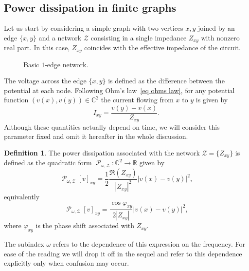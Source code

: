 \documentclass[11pt]{amsart}
\theoremstyle{definition}
\newtheorem{definition}{Definition}[section]
\theoremstyle{remark}
\theoremstyle{example}
\numberwithin{equation}{section}
\providecommand{\pd}[1]{\operatorname{\mathcal {P}}_{#1}}
\begin{document}
\subsection{Power dissipation in finite graphs}

Let us start by considering a simple graph with two vertices $x,y$ joined by an edge $\{x,y\}$ and a network ${\mathcal{Z}}$ consisting in a single impedance $Z_{xy}$ with nonzero real part. In this case, $Z_{xy}$ coincides with the effective impedance of the circuit.

\begin{figure}[H]
\centering
{}
\caption{Basic $1$-edge network.}
\label{simple network}
\end{figure}

The voltage across the edge $\{x,y\}$ is defined as the difference between the potential at each node. Following Ohm's law~\eqref{eq ohms law}, for any potential function $(v(x),v(y))\in{{\mathbb C}}^2$ the current flowing from $x$ to $y$ is given by
\begin{equation}\label{eq new Ohm}
I_{xy}=\frac{v(y)-v(x)}{Z_{xy}}.
\end{equation}
Although these quantities actually depend on time, we will consider this parameter fixed and omit it hereafter in the whole discussion.
\begin{definition}
The power dissipation associated with the network ${\mathcal{Z}}=\{Z_{xy}\}$ is defined as the quadratic form $\pd{\omega,{\mathcal{Z}}}\colon{{\mathbb C}}^2\to{{\mathbb R}}$ given by
\begin{equation}\label{eq P(v)}
\pd{\omega,{\mathcal{Z}}}[v]_{xy}=\frac{1}{2}\frac{\Re(Z_{xy})}{|Z_{xy}|^2}|v(x)-v(y)|^2,
\end{equation}
equivalently
\[
\pd{\omega,{\mathcal{Z}}}[v]_{xy}=\frac{\cos\varphi_{xy}}{2|Z_{xy}|}|v(x)-v(y)|^2,
\]
where $\varphi_{xy}$ is the phase shift associated with $Z_{xy}$.
\end{definition}
The subindex $\omega$ refers to the dependence of this expression on the frequency. For ease of the reading we will drop it off in the sequel and refer to this dependence explicitly only when confusion may occur.
\medskip
\end{document}
